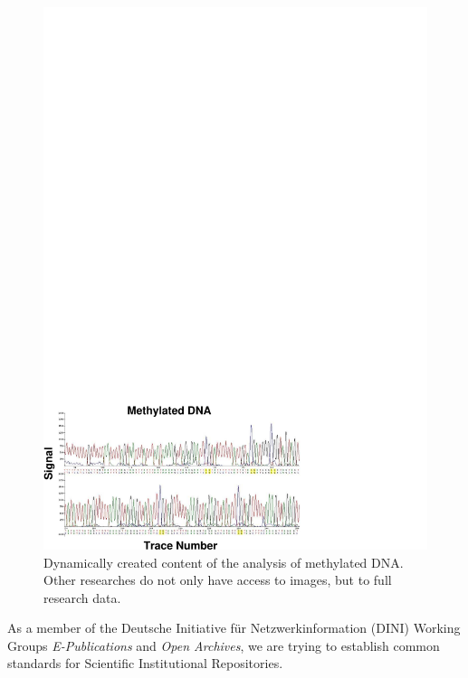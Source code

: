 \begin{figure}[ht]
  \begin{center}
    \includegraphics[width=\hsize,bb=0 0 390 230]{stamerjohanns-fig1.pdf}
    \caption{Dynamically created content of the analysis of methylated DNA. Other
    researches do not only have access to images, but to full research data.}\label{fig:stammerjohanns}
   \end{center}
\end{figure}

As a member of the Deutsche Initiative f\"ur Netzwerkinformation (DINI)
Working Groups \textsl{E-Publications}
and \textsl{Open Archives}, we are trying to establish common standards
for Scientific Institutional Repositories.

